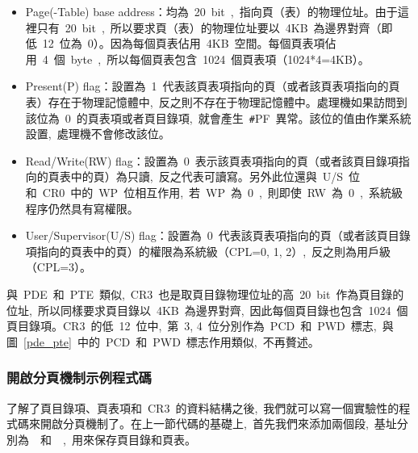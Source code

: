 
\begin{itemize}
\item Page(-Table) base address：均為~20~bit~,~指向頁（表）的物理位址。由于這裡只有~20~bit~,~所以要求頁（表）的物理位址要以~4KB~為邊界對齊（即低~12~位為~0）。因為每個頁表佔用~4KB~空間。每個頁表項佔用~4~個~byte~,~所以每個頁表包含~1024~個頁表項（1024*4=4KB）。
\item Present(P) flag：設置為~1~代表該頁表項指向的頁（或者該頁表項指向的頁表）存在于物理記憶體中,~反之則不存在于物理記憶體中。處理機如果訪問到該位為~0~的頁表項或者頁目錄項,~就會產生~\texttt{\#}PF~異常。該位的值由作業系統設置,~處理機不會修改該位。
\item Read/Write(RW) flag：設置為~0~表示該頁表項指向的頁（或者該頁目錄項指向的頁表中的頁）為只讀,~反之代表可讀寫。另外此位還與~U/S~位和~CR0~中的~WP~位相互作用,~若~WP~為~0~,~則即使~RW~為~0~,~系統級程序仍然具有寫權限。
\item User/Supervisor(U/S) flag：設置為~0~代表該頁表項指向的頁（或者該頁目錄項指向的頁表中的頁）的權限為系統級（CPL=0, 1, 2）,~反之則為用戶級（CPL=3）。
\end{itemize}

與~PDE~和~PTE~類似,~CR3~也是取頁目錄物理位址的高~20~bit~作為頁目錄的位址,~所以同樣要求頁目錄以~4KB~為邊界對齊,~因此每個頁目錄也包含~1024~個頁目錄項。CR3~的低~12~位中,~第~3, 4~位分別作為~PCD~和~PWD~標志,~與圖~\ref{pde_pte}~中的~PCD~和~PWD~標志作用類似,~不再贅述。

\subsubsection{開啟分頁機制示例程式碼}

了解了頁目錄項、頁表項和~CR3~的資料結構之後,~我們就可以寫一個實驗性的程式碼來開啟分頁機制了。在上一節代碼的基礎上,~首先我們來添加兩個段,~基址分別為~~和~~,~用來保存頁目錄和頁表。


